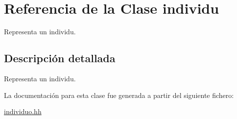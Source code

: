 \hypertarget{classindividu}{}\section{Referencia de la Clase individu}
\label{classindividu}


Representa un individu.  




\subsection{Descripción detallada}
Representa un individu. 

La documentación para esta clase fue generada a partir del siguiente fichero\+:\begin{DoxyCompactItemize}
\item 
\hyperlink{individuo_8hh}{individuo.\+hh}\end{DoxyCompactItemize}
